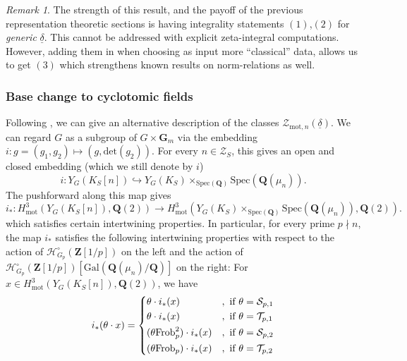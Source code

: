 \documentclass{amsart}%
\theoremstyle{plain}
\theoremstyle{plain}
\theoremstyle{remark}
\newtheorem{rem}[thm]{Remark}
\begin{document}
\begin{rem}
The strength of this result, and the payoff of the previous representation theoretic sections is having integrality statements $(1)$,$(2)$ for \textit{generic} $\underline{\delta}$. This cannot be addressed with explicit zeta-integral computations. However, adding them in when choosing as input more ``classical'' data, allows us to get $(3)$ which strengthens known results on norm-relations as well.
\end{rem}
\subsubsection{Base change to cyclotomic fields}\label{sec base change}
Following \cite[\S $8.2$]{Loeffler_2021}, we can give an alternative description of the classes $\mathcal{Z}_{\mathrm{mot},n}(\underline{\delta})$. We can regard $G$ as a subgroup of $G\times \mathbf{G}_m$ via the embedding $i:g=(g_1,g_2)\mapsto(g,\mathrm{det}(g_2))$. For every $n\in\mathscr{Z}_S$, this gives an open and closed embedding (which we still denote by $i$)
$$i:Y_G(K_S[n])\hookrightarrow Y_G(K_S)\times_{\mathrm{Spec}(\mathbf{Q})}\mathrm{Spec}(\mathbf{Q}(\mu_n)).$$
The pushforward along this map gives
$$i_*:H_{\mathrm{mot}}^3\left(Y_G(K_S[n]),\mathbf{Q}(2)\right)\longrightarrow H_\mathrm{mot}^3\left(Y_G(K_S)\times_{\mathrm{Spec}(\mathbf{Q})}\mathrm{Spec}(\mathbf{Q}(\mu_n)),\mathbf{Q}(2)\right).$$
which satisfies certain intertwining properties. In particular, for every prime $p\nmid n$, the map $i_*$ satisfies the following intertwining properties with respect to the action of $\mathcal{H}_{G_p}^\circ(\mathbf{Z}[1/p])$ on the left and the action of $\mathcal{H}_{G_p}^\circ(\mathbf{Z}[1/p])[\mathrm{Gal}(\mathbf{Q}(\mu_n)/\mathbf{Q})]$ on the right: For $x\in H_{\mathrm{mot}}^3\left(Y_G(K_S[n]),\mathbf{Q}(2)\right)$, we have
\begin{align}\label{eq: intert. props.}i_*(\theta\cdot x)=\begin{dcases}
    \theta\cdot i_*(x)&,\ \text{if} \ \theta=\mathcal{S}_{p,1}\\
    \theta\cdot i_*(x)&,\ \text{if} \ \theta=\mathcal{T}_{p,1}\\
    (\theta \mathrm{Frob}_p^{2})\cdot i_*(x)&,\ \text{if} \ \theta=\mathcal{S}_{p,2}\\
    (\theta\mathrm{Frob}_p)\cdot i_*(x)&,\ \text{if} \ \theta=\mathcal{T}_{p,2}
\end{dcases}\end{align}
\end{document}

